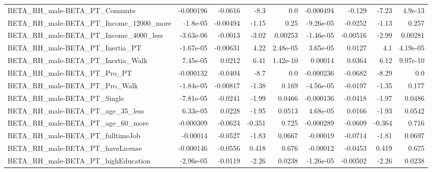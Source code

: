 \begin{tabular}{lrrrrrrrr}
BETA\_RH\_male-BETA\_PT\_Commute                       &   -0.000196 &      -0.0616 &     -8.3 &      0.0 &  -0.000494 &      -0.129 &        -7.23 &       4.9e-13 \\
BETA\_RH\_male-BETA\_PT\_Income\_12000\_more             &    -1.8e-05 &     -0.00494 &    -1.15 &     0.25 &  -9.26e-05 &     -0.0252 &        -1.13 &         0.257 \\
BETA\_RH\_male-BETA\_PT\_Income\_4000\_less              &   -3.63e-06 &      -0.0013 &    -3.02 &  0.00253 &  -1.46e-05 &    -0.00516 &        -2.99 &       0.00281 \\
BETA\_RH\_male-BETA\_PT\_Inertia\_PT                    &   -1.67e-05 &     -0.00631 &     4.22 & 2.48e-05 &   3.65e-05 &      0.0127 &          4.1 &      4.19e-05 \\
BETA\_RH\_male-BETA\_PT\_Inertia\_Walk                  &    7.45e-05 &       0.0212 &     6.41 & 1.42e-10 &    0.00014 &      0.0364 &         6.12 &      9.07e-10 \\
BETA\_RH\_male-BETA\_PT\_Pro\_PT                        &   -0.000132 &      -0.0404 &     -8.7 &      0.0 &  -0.000236 &     -0.0682 &        -8.29 &           0.0 \\
BETA\_RH\_male-BETA\_PT\_Pro\_Walk                      &   -1.84e-05 &     -0.00817 &    -1.38 &    0.169 &  -4.56e-05 &     -0.0197 &        -1.35 &         0.177 \\
BETA\_RH\_male-BETA\_PT\_Single                        &   -7.81e-05 &      -0.0241 &    -1.99 &   0.0466 &  -0.000136 &     -0.0418 &        -1.97 &        0.0486 \\
BETA\_RH\_male-BETA\_PT\_age\_35\_less                   &    6.33e-05 &       0.0228 &    -1.95 &   0.0513 &   4.68e-05 &      0.0166 &        -1.93 &        0.0542 \\
BETA\_RH\_male-BETA\_PT\_age\_60\_more                   &   -0.000309 &      -0.0624 &   -0.351 &    0.725 &  -0.000289 &     -0.0609 &       -0.364 &         0.716 \\
BETA\_RH\_male-BETA\_PT\_fulltimeJob                   &    -0.00014 &      -0.0527 &    -1.83 &   0.0667 &   -0.00019 &     -0.0714 &        -1.81 &        0.0697 \\
BETA\_RH\_male-BETA\_PT\_haveLicense                   &   -0.000146 &      -0.0556 &    0.418 &    0.676 &   -0.00012 &     -0.0453 &        0.419 &         0.675 \\
BETA\_RH\_male-BETA\_PT\_highEducation                 &   -2.96e-05 &      -0.0119 &    -2.26 &   0.0238 &  -1.26e-05 &    -0.00502 &        -2.26 &        0.0238 \\

\end{tabular}
